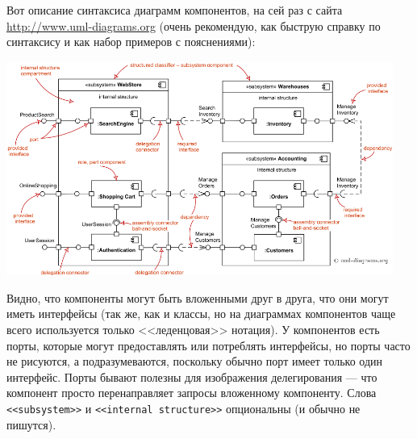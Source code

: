 \documentclass{../../text-style}
\begin{document}
Вот описание синтаксиса диаграмм компонентов, на сей раз с сайта \url{http://www.uml-diagrams.org} (очень рекомендую, как быструю справку по синтаксису и как набор примеров с пояснениями):

\begin{center}
    \includegraphics[width=0.95\textwidth]{componentDiagramsOverview.png}
\end{center}

Видно, что компоненты могут быть вложенными друг в друга, что они могут иметь интерфейсы (так же, как и классы, но на диаграммах компонентов чаще всего используется только <<леденцовая>> нотация). У компонентов есть порты, которые могут предоставлять или потреблять интерфейсы, но порты часто не рисуются, а подразумеваются, поскольку обычно порт имеет только один интерфейс. Порты бывают полезны для изображения делегирования --- что компонент просто перенаправляет запросы вложенному компоненту. Слова \verb|<<subsystem>>| и \verb|<<internal structure>>| опциональны (и обычно не пишутся).
\end{document}
